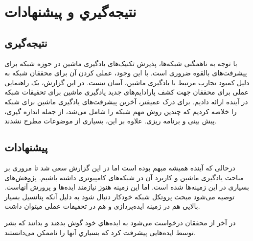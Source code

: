 \chapter{نتيجه‌گيري و پیشنهادات}
\section{نتیجه‌گیری}
با توجه به ناهمگنی شبکه‌ها، پذیرش تکنیک‌های یادگیری ماشین در حوزه شبکه برای پیشرفت‌های بالقوه ضروری است. با این وجود، عملی کردن آن برای محققان شبکه به دلیل کمبود تجارب مرتبط با یادگیری ماشین، آسان نیست. در این گزارش، یک راهنمایی عملی برای محققان جهت کشف پارادایم‌های جدید یادگیری ماشین برای تحقیقات شبکه در آینده ارائه دادیم. برای درک عمیقتر، آخرین پیشرفت‌های یادگیری ماشین برای شبکه را خلاصه کردیم که چندین روش مهم شبکه را شامل می‌شد، از جمله اندازه گیری، پیش بینی و برنامه ریزی. علاوه بر این، بسیاری از موضوعات مطرح نشدند.

\section{پیشنهادات}
درحالی که آینده همیشه مبهم بوده است اما در این گزارش سعی شد تا مروری بر مباحث یادگیری ماشین و کاربرد آن در شبکه‌های کامپیوتری داشته باشیم. پژوهش‌های بسیاری در این زمینه‌ها شده است. اما این زمینه هنوز نیازمند ایده‌ها و پرورش آنهاست. توصیه می‌شود مبحث پروتکل شبکه خودکار دنبال شود به دلیل آنکه پتانسیل بسیار بالایی هم در زمینه‌ ایده‌پردازی و هم در تحقیقات عملی میتوان داشت.


در آخر از محققان درخواست می‌شود به ایده‌هاي خود گوش بدهند و بدانند که بشر توسط ایده‌هایی پیشرفت کرد که بسیاري آنها را ناممکن می‌دانستند.
